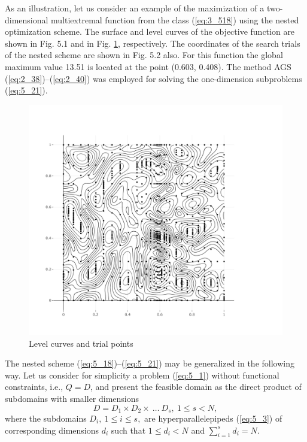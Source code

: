 As an illustration, let us consider an example of the maximization of a two-dimensional multiextremal function from the class (\ref{eq:3_518}) using the nested optimization scheme. The surface and level curves of the objective function are shown in Fig. 5.1 and in Fig. \ref{fig:5_2}, respectively. The coordinates of the search trials of the nested scheme are shown in Fig. 5.2 also. For this function the global maximum value 13.51 is located at the point (0.603, 0.408). The method AGS (\ref{eq:2_38})--(\ref{eq:2_40}) was employed for solving the one-dimension subproblems (\ref{eq:5_21}).
\begin{figure}[t]
\centering
\includegraphics[width=1.1\linewidth]{figures/figure_5_2.pdf}
\caption{Level curves and trial points}
\label{fig:5_2}    
\end{figure}

The nested scheme (\ref{eq:5_18})--(\ref{eq:5_21}) may be generalized in the following way. Let us consider for simplicity a problem (\ref{eq:5_1}) without functional constraints, i.e., $Q=D$, and present the feasible domain  as the direct product of subdomains with smaller dimensions
\begin{displaymath}
D=D_1\times D_2\times\:\ldots\: D_s,\:1\leq s<N,
\end{displaymath}
where the subdomains $D_i,\:1\leq i\leq s,$ are hyperparallelepipeds (\ref{eq:5_3}) of corresponding dimensions $d_i$ such that $1\leq d_i<N$ and $\sum_{i=1}^s{d_i}=N$.

